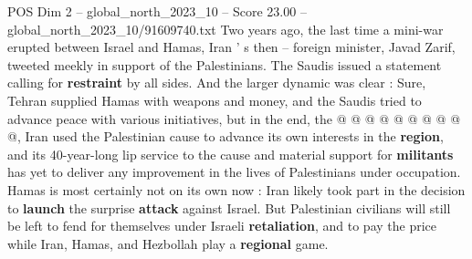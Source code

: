 \begin{textsample}{POS Dim 2 – global\_north\_2023\_10 – Score 23.00 – global\_north\_2023\_10/91609740.txt}
Two years ago, the last time a mini-war erupted between Israel and Hamas, Iran ' s then -- foreign minister, Javad Zarif, tweeted meekly in support of the Palestinians.
The Saudis issued a statement calling for \textbf{restraint} by all sides.
And the larger dynamic was clear : Sure, Tehran supplied Hamas with weapons and money, and the Saudis tried to advance peace with various initiatives, but in the end, the @ @ @ @ @ @ @ @ @ @, Iran used the Palestinian cause to advance its own interests in the \textbf{region}, and its 40-year-long lip service to the cause and material support for \textbf{militants} has yet to deliver any improvement in the lives of Palestinians under occupation.
Hamas is most certainly not on its own now : Iran likely took part in the decision to \textbf{launch} the surprise \textbf{attack} against Israel.
But Palestinian civilians will still be left to fend for themselves under Israeli \textbf{retaliation}, and to pay the price while Iran, Hamas, and Hezbollah play a \textbf{regional} game.

\end{textsample}
